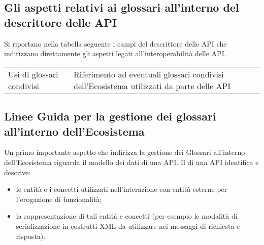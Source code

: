\documentclass[letterpaper,10pt,italian]{sphinxmanual}
\begin{document}
\subsection{Gli aspetti relativi ai glossari all’interno del descrittore delle API}
\label{\detokenize{sez23:sezione231}}\label{\detokenize{sez23:gli-aspetti-relativi-ai-glossari-allinterno-del-descrittore-delle-api}}
Si riportano nella tabella seguente i campi del descrittore delle API che indirizzano direttamente gli aspetti legati all’interoperabilità delle API.




\begin{savenotes}\sphinxattablestart
\centering
\begin{tabulary}{\linewidth}[t]{|T|T|}
\hline
{}\relax &\relax \\
\hline
Usi di glossari condivisi
&
Riferimento ad eventuali glossari condivisi dell’Ecosistema utilizzati da parte delle API
\\
\hline
\end{tabulary}
\par
\sphinxattableend\end{savenotes}


\subsection{Linee Guida per la gestione dei glossari all’interno dell’Ecosistema}
\label{\detokenize{sez23:sezione232}}\label{\detokenize{sez23:linee-guida-per-la-gestione-dei-glossari-allinterno-dellecosistema}}
Un primo importante aspetto che indirizza la gestione dei Glossari all’interno dell’Ecosistema riguarda il modello dei dati di una API.
Il  di una API identifica e descrive:
\begin{itemize}
\item {} 
le entità e i concetti utilizzati nell’interazione con entità esterne per l’erogazione di funzionalità;

\item {} 
la rappresentazione di tali entità e concetti (per esempio le modalità di  serializzazione in costrutti XML da utilizzare nei messaggi di richiesta e risposta).

\end{itemize}
\end{document}
